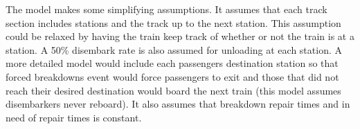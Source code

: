 The model makes some simplifying assumptions. It assumes that each track section
includes stations and the track up to the next station. This assumption could be
relaxed by having the train keep track of whether or not the train is at a
station. A 50\% disembark rate is also assumed for unloading at each station. A
more detailed model would include each passengers destination station so that
forced breakdowns event would force passengers to exit and those that did not
reach their desired destination would board the next train (this model assumes
disembarkers never reboard). It also assumes that breakdown repair times and in
need of repair times is constant.

\newcommand{\InBreakDown}[0]{(\text{``Breakdown''}, ())}
\newcommand{\InCapReq}[0]{(\text{``Capacity Request''}, ())}
\newcommand{\InMoveRes}[1]{(\text{``Move Response''}, #1)}
\newcommand{\InLoadPassengers}[1]{(\text{``Load Passengers''}, #1)}

\newcommand{\OutRemainingCapacity}[1]{(\text{``Remaining Capacity''}, #1)}
\newcommand{\OutUnloadPassengers}[1]{(\text{``Unload Passengers''}, #1)}
\newcommand{\OutMoveReq}[1]{(\text{``Move Request''}, #1)}
\newcommand{\phase}[0]{\text{phase}}

\newcommand{\Mod}[2]{\mathrm{mod} (#1, #2)}

